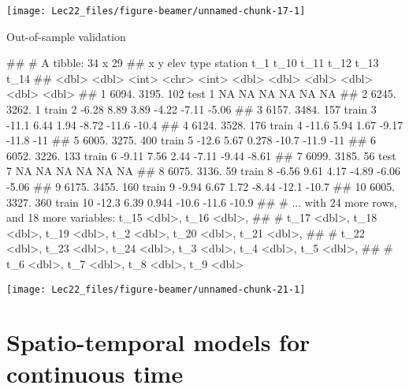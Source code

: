 \documentclass[11pt,ignorenonframetext,]{beamer}
\let\oldverbatim\verbatim
\let\endoldverbatim\endverbatim
\renewenvironment{verbatim}{\footnotesize\begin{spacing}{0.9}\oldverbatim}{\endoldverbatim\end{spacing}}
\begin{document}
\begin{frame}{}
\protect\hypertarget{section-4}{}

\begin{center}\texttt{[image: Lec22\_files/figure-beamer/unnamed-chunk-17-1]} \end{center}

\end{frame}

\begin{frame}[fragile]{Out-of-sample validation}
\protect\hypertarget{out-of-sample-validation}{}

\begin{verbatim}
## # A tibble: 34 x 29
##        x     y  elev type  station    t_1  t_10   t_11   t_12   t_13   t_14
##    <dbl> <dbl> <int> <chr>   <int>  <dbl> <dbl>  <dbl>  <dbl>  <dbl>  <dbl>
##  1 6094. 3195.   102 test        1  NA    NA    NA      NA     NA     NA   
##  2 6245. 3262.     1 train       2  -6.28  8.89  3.89   -4.22  -7.11  -5.06
##  3 6157. 3484.   157 train       3 -11.1   6.44  1.94   -8.72 -11.6  -10.4 
##  4 6124. 3528.   176 train       4 -11.6   5.94  1.67   -9.17 -11.8  -11   
##  5 6005. 3275.   400 train       5 -12.6   5.67  0.278 -10.7  -11.9  -11   
##  6 6052. 3226.   133 train       6  -9.11  7.56  2.44   -7.11  -9.44  -8.61
##  7 6099. 3185.    56 test        7  NA    NA    NA      NA     NA     NA   
##  8 6075. 3136.    59 train       8  -6.56  9.61  4.17   -4.89  -6.06  -5.06
##  9 6175. 3455.   160 train       9  -9.94  6.67  1.72   -8.44 -12.1  -10.7 
## 10 6005. 3327.   360 train      10 -12.3   6.39  0.944 -10.6  -11.6  -10.9 
## # ... with 24 more rows, and 18 more variables: t_15 <dbl>, t_16 <dbl>,
## #   t_17 <dbl>, t_18 <dbl>, t_19 <dbl>, t_2 <dbl>, t_20 <dbl>, t_21 <dbl>,
## #   t_22 <dbl>, t_23 <dbl>, t_24 <dbl>, t_3 <dbl>, t_4 <dbl>, t_5 <dbl>,
## #   t_6 <dbl>, t_7 <dbl>, t_8 <dbl>, t_9 <dbl>
\end{verbatim}

\end{frame}

\begin{frame}{}
\protect\hypertarget{section-5}{}

\begin{center}\texttt{[image: Lec22\_files/figure-beamer/unnamed-chunk-21-1]} \end{center}

\end{frame}

\hypertarget{spatio-temporal-models-for-continuous-time}{%
\section{Spatio-temporal models for continuous
time}\label{spatio-temporal-models-for-continuous-time}}
\end{document}
